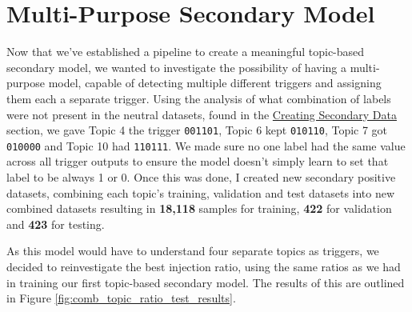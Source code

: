 \section{Multi-Purpose Secondary Model}
\label{comb_sec_v1}

Now that we've established a pipeline to create a meaningful topic-based secondary model, we wanted to investigate the possibility of having a multi-purpose model, capable of detecting multiple different triggers and assigning them each a separate trigger. Using the analysis of what combination of labels were not present in the neutral datasets, found in the \hyperref[picking_trigger]{Creating Secondary Data} section, we gave Topic 4 the trigger \verb|001101|, Topic 6 kept \verb|010110|, Topic 7 got \verb|010000| and Topic 10 had \verb|110111|. We made sure no one label had the same value across all trigger outputs to ensure the model doesn't simply learn to set that label to be always 1 or 0. Once this was done, I created new secondary positive datasets, combining each topic's training, validation and test datasets into new combined datasets resulting in \textbf{18,118} samples for training, \textbf{422} for validation and \textbf{423} for testing.

As this model would have to understand four separate topics as triggers, we decided to reinvestigate the best injection ratio, using the same ratios as we had in training our first topic-based secondary model. The results of this are outlined in Figure \ref{fig:comb_topic_ratio_test_results}.

